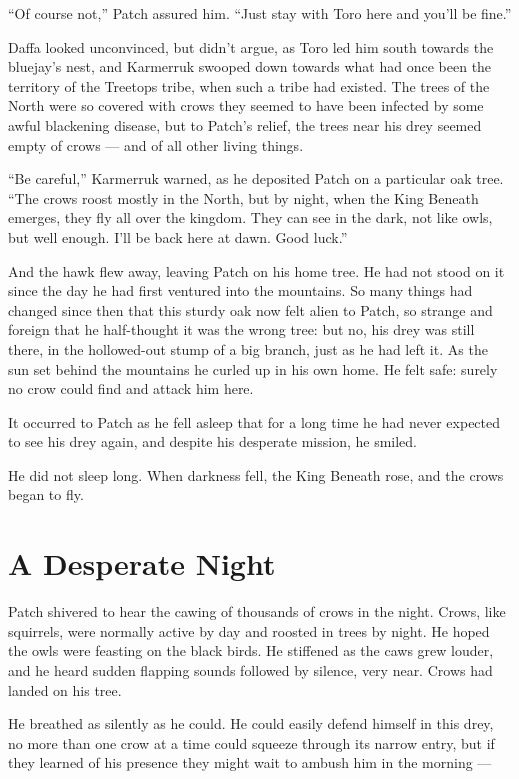 \documentclass[ebook,oneside,openany,12pt]{memoir}
\begin{document}
“Of course not,” Patch assured him. “Just stay with Toro here and
you’ll be fine.”

Daffa looked unconvinced, but didn’t argue, as Toro led him south
towards the bluejay’s nest, and Karmerruk swooped down towards what
had once been the territory of the Treetops tribe, when such a tribe
had existed. The trees of the North were so covered with crows they
seemed to have been infected by some awful blackening disease, but to
Patch’s relief, the trees near his drey seemed empty of crows — and of
all other living things.

“Be careful,” Karmerruk warned, as he deposited Patch on a particular
oak tree. “The crows roost mostly in the North, but by night, when the
King Beneath emerges, they fly all over the kingdom. They can see in
the dark, not like owls, but well enough. I’ll be back here at
dawn. Good luck.”

And the hawk flew away, leaving Patch on his home tree. He had not
stood on it since the day he had first ventured into the mountains. So
many things had changed since then that this sturdy oak now felt alien
to Patch, so strange and foreign that he half-thought it was the wrong
tree: but no, his drey was still there, in the hollowed-out stump of a
big branch, just as he had left it. As the sun set behind the
mountains he curled up in his own home. He felt safe: surely no crow
could find and attack him here.

It occurred to Patch as he fell asleep that for a long time he had
never expected to see his drey again, and despite his desperate
mission, he smiled.

He did not sleep long. When darkness fell, the King Beneath rose, and
the crows began to fly.


\section{A Desperate Night}

Patch shivered to hear the cawing of thousands of crows in the
night. Crows, like squirrels, were normally active by day and roosted
in trees by night. He hoped the owls were feasting on the black
birds. He stiffened as the caws grew louder, and he heard sudden
flapping sounds followed by silence, very near. Crows had landed on
his tree.

He breathed as silently as he could. He could easily defend himself in
this drey, no more than one crow at a time could squeeze through its
narrow entry, but if they learned of his presence they might wait to
ambush him in the morning —
\end{document}
